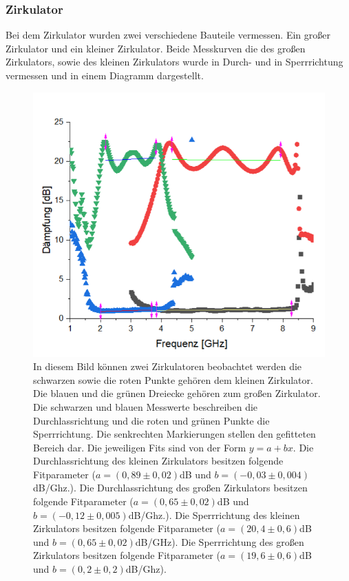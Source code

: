 \subsubsection{Zirkulator}
Bei dem Zirkulator wurden zwei verschiedene Bauteile vermessen. Ein großer Zirkulator und ein kleiner Zirkulator. Beide Messkurven die des großen Zirkulators, sowie des kleinen Zirkulators wurde in Durch- und in Sperrrichtung vermessen und in einem Diagramm dargestellt.
\begin{figure}[h!]
	\centering
	\includegraphics[scale = 1]{Zirkulator11.png}
	\caption{In diesem Bild können zwei Zirkulatoren beobachtet werden die schwarzen sowie die roten Punkte gehören dem kleinen Zirkulator. Die blauen und die grünen Dreiecke gehören zum großen Zirkulator. Die schwarzen und blauen Messwerte beschreiben die Durchlassrichtung und die roten und grünen Punkte die Sperrrichtung. Die senkrechten Markierungen stellen den gefitteten Bereich dar.
	Die jeweiligen Fits sind von der Form $y = a + bx$. 
	Die Durchlassrichtung des kleinen Zirkulators besitzen folgende Fitparameter ($a = (0,89 \pm 0,02)$dB und $b = (-0,03 \pm 0,004)$dB/Ghz.).
	Die Durchlassrichtung des großen Zirkulators besitzen folgende Fitparameter ($a = (0,65 \pm 0,02)$dB und $b = (-0,12 \pm 0,005)$dB/Ghz.).
	Die Sperrrichtung des kleinen Zirkulators besitzen folgende Fitparameter ($a = (20,4 \pm 0,6)$dB und $b = (0,65 \pm 0,02)$dB/GHz).
	Die Sperrrichtung des großen Zirkulators besitzen folgende Fitparameter ($a = (19,6 \pm 0,6)$dB und $b = (0,2 \pm 0,2)$dB/Ghz).}
	\label{ZirkB}
\end{figure}
